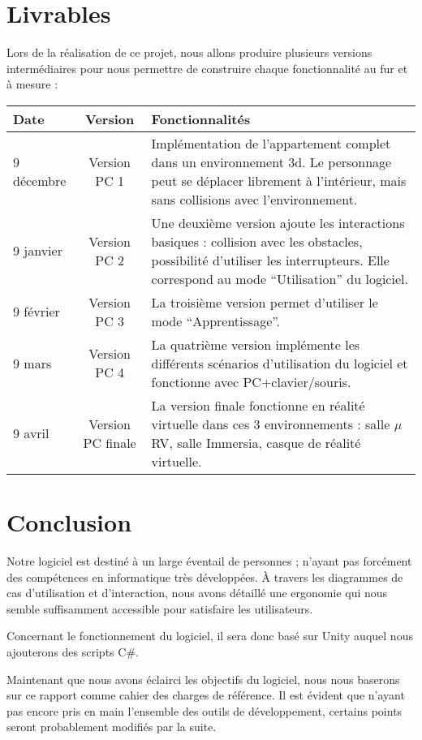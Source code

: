 \section{Livrables}
Lors de la réalisation de ce projet, nous allons produire plusieurs versions intermédiaires pour nous permettre de construire chaque fonctionnalité au fur et à mesure :
\begin{tabular}{|l|c|p{8cm}|}
  \hline
  Date & Version & Fonctionnalités \\
  \hline
  9 décembre & Version PC 1 & Implémentation de l'appartement complet dans un environnement 3d. Le personnage peut se déplacer librement à l'intérieur, mais sans collisions avec l'environnement. \\
  \hline
  9 janvier & Version PC 2 & Une deuxième version ajoute les interactions basiques : collision avec les obstacles, possibilité d'utiliser les interrupteurs. Elle correspond au mode \enquote{Utilisation} du logiciel. \\
  \hline
  9 février & Version PC 3 & La troisième version permet d'utiliser le mode \enquote{Apprentissage}. \\
  \hline
  9 mars & Version PC 4 & La quatrième version implémente les différents scénarios d'utilisation du logiciel et fonctionne avec PC+clavier/souris. \\
  \hline
  9 avril & Version PC finale & La version finale fonctionne en réalité virtuelle dans ces 3 environnements : salle $\mu$RV, salle Immersia, casque de réalité virtuelle.\\
  \hline
\end{tabular}

\section{Conclusion}
Notre logiciel est destiné à un large éventail de personnes ; n'ayant pas forcément des compétences en informatique très développées.
\`A travers les diagrammes de cas d'utilisation et d'interaction, nous avons détaillé une ergonomie qui nous semble suffisamment accessible pour satisfaire les utilisateurs.

Concernant le fonctionnement du logiciel, il sera donc basé sur Unity auquel nous ajouterons des scripts C\#.

Maintenant que nous avons éclairci les objectifs du logiciel, nous nous baserons sur ce rapport comme cahier des charges de référence. Il est évident que n'ayant pas encore pris en main l'ensemble des outils de développement, certains points seront probablement modifiés par la suite.




